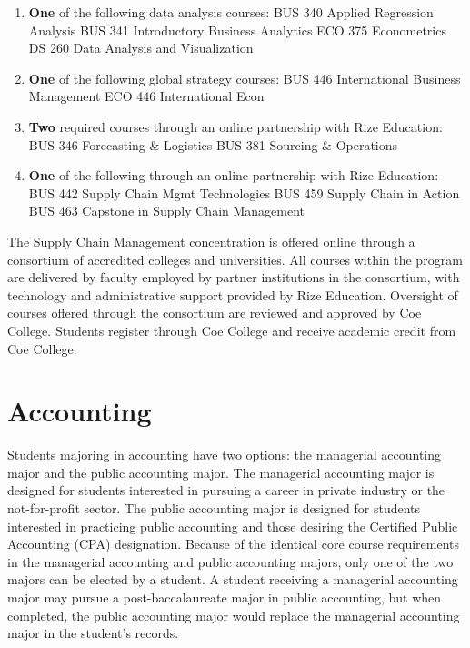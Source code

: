 \documentclass[
  letterpaper,
]{scrbook}
\providecommand{\tightlist}{%
  \setlength{\itemsep}{0pt}\setlength{\parskip}{0pt}}
\begin{document}
\begin{enumerate}
\def\labelenumi{\arabic{enumi}.}
\tightlist
\item
  \textbf{One} of the following data analysis courses: BUS 340 Applied
  Regression Analysis BUS 341 Introductory Business Analytics ECO 375
  Econometrics DS 260 Data Analysis and Visualization
\item
  \textbf{One} of the following global strategy courses: BUS 446
  International Business Management ECO 446 International Econ
\item
  \textbf{Two} required courses through an online partnership with Rize
  Education: BUS 346 Forecasting \& Logistics BUS 381 Sourcing \&
  Operations
\item
  \textbf{One} of the following through an online partnership with Rize
  Education: BUS 442 Supply Chain Mgmt Technologies BUS 459 Supply Chain
  in Action BUS 463 Capstone in Supply Chain Management
\end{enumerate}

The Supply Chain Management concentration is offered online through a
consortium of accredited colleges and universities. All courses within
the program are delivered by faculty employed by partner institutions in
the consortium, with technology and administrative support provided by
Rize Education. Oversight of courses offered through the consortium are
reviewed and approved by Coe College. Students register through Coe
College and receive academic credit from Coe College.

\section{Accounting}\label{accounting}

Students majoring in accounting have two options: the managerial
accounting major and the public accounting major. The managerial
accounting major is designed for students interested in pursuing a
career in private industry or the not-for-profit sector. The public
accounting major is designed for students interested in practicing
public accounting and those desiring the Certified Public Accounting
(CPA) designation. Because of the identical core course requirements in
the managerial accounting and public accounting majors, only one of the
two majors can be elected by a student. A student receiving a managerial
accounting major may pursue a post-baccalaureate major in public
accounting, but when completed, the public accounting major would
replace the managerial accounting major in the student's records.
\end{document}

